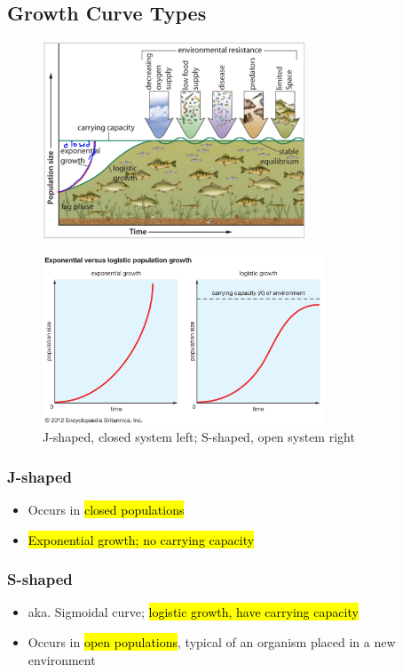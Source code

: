 \documentclass[a4paper,12pt]{article}
\begin{document}
\subsection{Growth Curve Types}
\begin{figure}[H]
    \centering
    \includegraphics[width=0.7\textwidth]{curves}
\end{figure}
\begin{figure}[H]
    \centering
    \includegraphics[width=0.75\textwidth]{scurve}
    \caption{J-shaped, closed system left; S-shaped, open system right}
\end{figure}
\subsubsection{J-shaped}
\begin{itemize}
    \item{Occurs in \hl{closed populations}}
    \item{\hl{Exponential growth; no carrying capacity}}
\end{itemize}
\subsubsection{S-shaped}
\begin{itemize}
    \item{aka. Sigmoidal curve; \hl{logistic growth, have carrying capacity}}
    \item{Occurs in \hl{open populations}, typical of an organism placed in a new environment}
\end{itemize}
\end{document}
